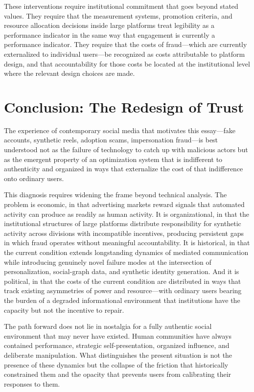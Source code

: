\documentclass[12pt, a4paper]{article}
\begin{document}
These interventions require institutional commitment that goes beyond stated values. They require that the measurement systems, promotion criteria, and resource allocation decisions inside large platforms treat legibility as a performance indicator in the same way that engagement is currently a performance indicator. They require that the costs of fraud---which are currently externalized to individual users---be recognized as costs attributable to platform design, and that accountability for those costs be located at the institutional level where the relevant design choices are made.

\section{Conclusion: The Redesign of Trust}

The experience of contemporary social media that motivates this essay---fake accounts, synthetic reels, adoption scams, impersonation fraud---is best understood not as the failure of technology to catch up with malicious actors but as the emergent property of an optimization system that is indifferent to authenticity and organized in ways that externalize the cost of that indifference onto ordinary users.

This diagnosis requires widening the frame beyond technical analysis. The problem is economic, in that advertising markets reward signals that automated activity can produce as readily as human activity. It is organizational, in that the institutional structures of large platforms distribute responsibility for synthetic activity across divisions with incompatible incentives, producing persistent gaps in which fraud operates without meaningful accountability. It is historical, in that the current condition extends longstanding dynamics of mediated communication while introducing genuinely novel failure modes at the intersection of personalization, social-graph data, and synthetic identity generation. And it is political, in that the costs of the current condition are distributed in ways that track existing asymmetries of power and resource---with ordinary users bearing the burden of a degraded informational environment that institutions have the capacity but not the incentive to repair.

The path forward does not lie in nostalgia for a fully authentic social environment that may never have existed. Human communities have always contained performance, strategic self-presentation, organized influence, and deliberate manipulation. What distinguishes the present situation is not the presence of these dynamics but the collapse of the friction that historically constrained them and the opacity that prevents users from calibrating their responses to them.
\end{document}
